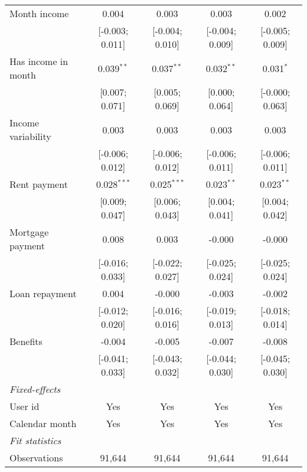 \begin{table}[htbp]
\begin{threeparttable}[b]
\begin{tabular}{lcccc}
         Month income           & 0.004           & 0.003           & 0.003            & 0.002\\   
                                & [-0.003; 0.011] & [-0.004; 0.010] & [-0.004; 0.009]  & [-0.005; 0.009]\\   
         Has income in month    & 0.039$^{**}$    & 0.037$^{**}$    & 0.032$^{**}$     & 0.031$^{*}$\\   
                                & [0.007; 0.071]  & [0.005; 0.069]  & [0.000; 0.064]   & [-0.000; 0.063]\\   
         Income variability     & 0.003           & 0.003           & 0.003            & 0.003\\   
                                & [-0.006; 0.012] & [-0.006; 0.012] & [-0.006; 0.011]  & [-0.006; 0.011]\\   
         Rent payment           & 0.028$^{***}$   & 0.025$^{***}$   & 0.023$^{**}$     & 0.023$^{**}$\\   
                                & [0.009; 0.047]  & [0.006; 0.043]  & [0.004; 0.041]   & [0.004; 0.042]\\   
         Mortgage payment       & 0.008           & 0.003           & -0.000           & -0.000\\   
                                & [-0.016; 0.033] & [-0.022; 0.027] & [-0.025; 0.024]  & [-0.025; 0.024]\\   
         Loan repayment         & 0.004           & -0.000          & -0.003           & -0.002\\   
                                & [-0.012; 0.020] & [-0.016; 0.016] & [-0.019; 0.013]  & [-0.018; 0.014]\\   
         Benefits               & -0.004          & -0.005          & -0.007           & -0.008\\   
                                & [-0.041; 0.033] & [-0.043; 0.032] & [-0.044; 0.030]  & [-0.045; 0.030]\\   
         \midrule
         \emph{Fixed-effects}\\
         User id                & Yes             & Yes             & Yes              & Yes\\  
         Calendar month         & Yes             & Yes             & Yes              & Yes\\  
         \midrule
         \emph{Fit statistics}\\
         Observations           & 91,644          & 91,644          & 91,644           & 91,644\\  

\end{tabular}
\end{threeparttable}
\end{table}
